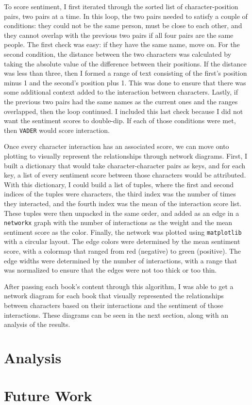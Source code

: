 \documentclass[stu,12pt,floatsintext]{apa7}
\newcommand{\code}[1]{\colorbox{light-gray}{\texttt{#1}}}
\begin{document}
To score sentiment, I first iterated through the sorted list of character-position pairs, two pairs at a time. In this loop, the two pairs needed to satisfy a couple of conditions: they could not be the same person, must be close to each other, and they cannot overlap with the previous two pairs if all four pairs are the same people. The first check was easy: if they have the same name, move on. For the second condition, the distance between the two characters was calculated by taking the absolute value of the difference between their positions. If the distance was less than three, then I formed a range of text consisting of the first's position minus 1 and the second's position plus 1. This was done to ensure that there was some additional context added to the interaction between characters. Lastly, if the previous two pairs had the same names as the current ones and the ranges overlapped, then the loop continued. I included this last check because I did not want the sentiment scores to double-dip. If each of those conditions were met, then \code{VADER} would score interaction. 

Once every character interaction has an associated score, we can move onto plotting to visually represent the relationships through network diagrams. First, I built a dictionary that would take character-character pairs as keys, and for each key, a list of every sentiment score between those characters would be attributed. With this dictionary, I could build a list of tuples, where the first and second indices of the tuples were characters, the third index was the number of times they interacted, and the fourth index was the mean of the interaction score list. These tuples were then unpacked in the same order, and added as an edge in a \code{networkx} graph with the number of interactions as the weight and the mean sentiment score as the color. Finally, the network was plotted using \code{matplotlib} with a circular layout. The edge colors were determined by the mean sentiment score, with a colormap that ranged from red (negative) to green (positive). The edge widths were determined by the number of interactions, with a range that was normalized to ensure that the edges were not too thick or too thin.

After passing each book's content through this algorithm, I was able to get a network diagram for each book that visually represented the relationships between characters based on their interactions and the sentiment of those interactions. These diagrams can be seen in the next section, along with an analysis of the results.

\section{Analysis}



\section{Future Work}



\printbibliography
\end{document}
